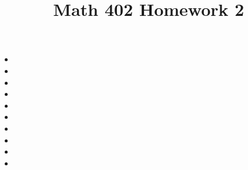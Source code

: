 \documentclass{article}
\title{Math 402 Homework 2}
\begin{document}
\maketitle
\begin{itemize}[label=]
	\item 
	\item 
	\item 
	\item 
	\item 
	\item 
	\item 
	\item 
	\item 
	\item 
\end{itemize}
\end{document}
